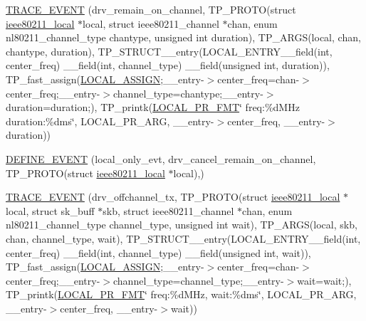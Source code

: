 \begin{DoxyCompactItemize}
\hyperlink{driver-trace_8h_ae53eeee8d20ebb9a4abe9cce48bc7302}{T\-R\-A\-C\-E\-\_\-\-E\-V\-E\-N\-T} (drv\-\_\-remain\-\_\-on\-\_\-channel, T\-P\-\_\-\-P\-R\-O\-T\-O(struct \hyperlink{structieee80211__local}{ieee80211\-\_\-local} $\ast$local, struct ieee80211\-\_\-channel $\ast$chan, enum nl80211\-\_\-channel\-\_\-type chantype, unsigned int duration), T\-P\-\_\-\-A\-R\-G\-S(local, chan, chantype, duration), T\-P\-\_\-\-S\-T\-R\-U\-C\-T\-\_\-\-\_\-entry(L\-O\-C\-A\-L\-\_\-\-E\-N\-T\-R\-Y\-\_\-\-\_\-field(int, center\-\_\-freq) \-\_\-\-\_\-field(int, channel\-\_\-type) \-\_\-\-\_\-field(unsigned int, duration)), T\-P\-\_\-fast\-\_\-assign(\hyperlink{driver-trace_8h_ab19d9141887ea92ef9640df06a51e0a1}{L\-O\-C\-A\-L\-\_\-\-A\-S\-S\-I\-G\-N};\-\_\-\-\_\-entry-\/$>$center\-\_\-freq=chan-\/$>$center\-\_\-freq;\-\_\-\-\_\-entry-\/$>$channel\-\_\-type=chantype;\-\_\-\-\_\-entry-\/$>$duration=duration;), T\-P\-\_\-printk(\hyperlink{driver-trace_8h_a09833af423135e21ffe99a59ae088cf1}{L\-O\-C\-A\-L\-\_\-\-P\-R\-\_\-\-F\-M\-T}\char`\"{} freq\-:\%d\-M\-Hz duration\-:\%dms\char`\"{}, L\-O\-C\-A\-L\-\_\-\-P\-R\-\_\-\-A\-R\-G, \-\_\-\-\_\-entry-\/$>$center\-\_\-freq, \-\_\-\-\_\-entry-\/$>$duration))
\item 
\hyperlink{driver-trace_8h_aeb2919b1c7eb03065e8bd5fc61853b12}{D\-E\-F\-I\-N\-E\-\_\-\-E\-V\-E\-N\-T} (local\-\_\-only\-\_\-evt, drv\-\_\-cancel\-\_\-remain\-\_\-on\-\_\-channel, T\-P\-\_\-\-P\-R\-O\-T\-O(struct \hyperlink{structieee80211__local}{ieee80211\-\_\-local} $\ast$local),)
\item 
\hyperlink{driver-trace_8h_ac3e1c420c7845de47f0d487e5a655fa0}{T\-R\-A\-C\-E\-\_\-\-E\-V\-E\-N\-T} (drv\-\_\-offchannel\-\_\-tx, T\-P\-\_\-\-P\-R\-O\-T\-O(struct \hyperlink{structieee80211__local}{ieee80211\-\_\-local} $\ast$local, struct sk\-\_\-buff $\ast$skb, struct ieee80211\-\_\-channel $\ast$chan, enum nl80211\-\_\-channel\-\_\-type channel\-\_\-type, unsigned int wait), T\-P\-\_\-\-A\-R\-G\-S(local, skb, chan, channel\-\_\-type, wait), T\-P\-\_\-\-S\-T\-R\-U\-C\-T\-\_\-\-\_\-entry(L\-O\-C\-A\-L\-\_\-\-E\-N\-T\-R\-Y\-\_\-\-\_\-field(int, center\-\_\-freq) \-\_\-\-\_\-field(int, channel\-\_\-type) \-\_\-\-\_\-field(unsigned int, wait)), T\-P\-\_\-fast\-\_\-assign(\hyperlink{driver-trace_8h_ab19d9141887ea92ef9640df06a51e0a1}{L\-O\-C\-A\-L\-\_\-\-A\-S\-S\-I\-G\-N};\-\_\-\-\_\-entry-\/$>$center\-\_\-freq=chan-\/$>$center\-\_\-freq;\-\_\-\-\_\-entry-\/$>$channel\-\_\-type=channel\-\_\-type;\-\_\-\-\_\-entry-\/$>$wait=wait;), T\-P\-\_\-printk(\hyperlink{driver-trace_8h_a09833af423135e21ffe99a59ae088cf1}{L\-O\-C\-A\-L\-\_\-\-P\-R\-\_\-\-F\-M\-T}\char`\"{} freq\-:\%d\-M\-Hz, wait\-:\%dms\char`\"{}, L\-O\-C\-A\-L\-\_\-\-P\-R\-\_\-\-A\-R\-G, \-\_\-\-\_\-entry-\/$>$center\-\_\-freq, \-\_\-\-\_\-entry-\/$>$wait))

\end{DoxyCompactItemize}

